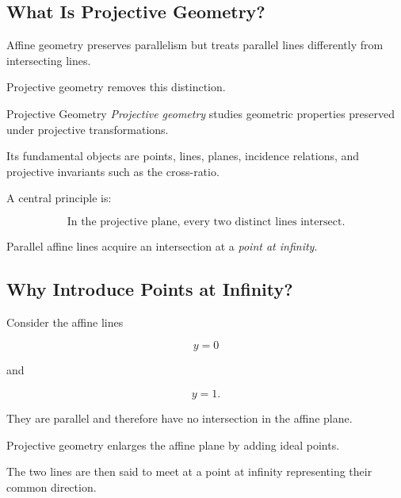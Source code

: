 \subsection{What Is Projective Geometry?}
\label{subsec:what-is-projective-geometry}

Affine geometry preserves parallelism but treats parallel lines differently
from intersecting lines.

Projective geometry removes this distinction.

\begin{definitionbox}{Projective Geometry}
\emph{Projective geometry} studies geometric properties preserved under
projective transformations.

Its fundamental objects are points, lines, planes, incidence relations, and
projective invariants such as the cross-ratio.
\end{definitionbox}

A central principle is:

\[
\boxed{\text{In the projective plane, every two distinct lines intersect.}}
\]

Parallel affine lines acquire an intersection at a \emph{point at infinity}.

\subsection{Why Introduce Points at Infinity?}
\label{subsec:why-points-at-infinity}

Consider the affine lines

\[
y=0
\]

and

\[
y=1.
\]

They are parallel and therefore have no intersection in the affine plane.

Projective geometry enlarges the affine plane by adding ideal points.

The two lines are then said to meet at a point at infinity representing their
common direction.

\begin{centereddiagram}
\end{centereddiagram}

